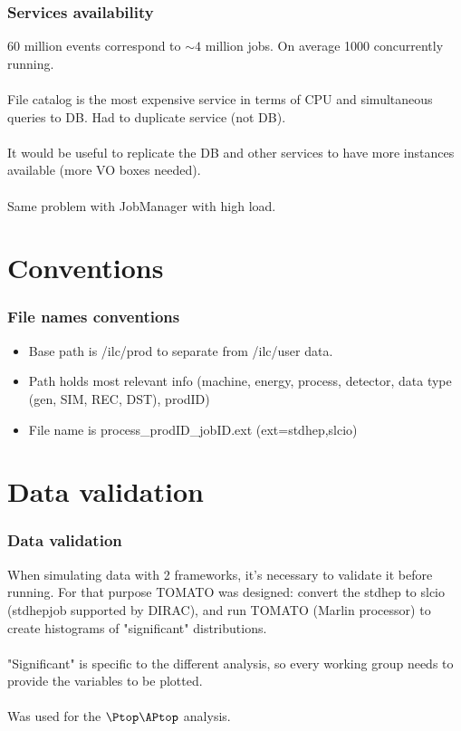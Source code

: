 \documentclass{beamer}
\begin{document}
\begin{frame}
\frametitle{Services availability}
60 million events correspond to $\sim 4$ million jobs. On average 1000 concurrently running.\\
~\\
File catalog is the most expensive service in terms of CPU and simultaneous queries to DB. Had to duplicate service (not DB). ~\\
~\\
It would be useful to replicate the DB and other services to have more instances available (more VO boxes needed).~\\
~\\
Same problem with JobManager with high load.
\end{frame}

\section{Conventions}
\begin{frame}
\frametitle{File names conventions}
\begin{itemize}
\item Base path is /ilc/prod to separate from /ilc/user data. 
\item Path holds most relevant info (machine, energy, process, detector, data type (gen, SIM, REC, DST), prodID)
\item File name is process\_prodID\_jobID.ext (ext=stdhep,slcio)
\end{itemize} 
 \end{frame}
\section{Data validation}
\begin{frame}
\frametitle{Data validation}
When simulating data with 2 frameworks, it's necessary to validate it before running. For that purpose \alert{TOMATO} was designed: convert the stdhep to slcio (stdhepjob supported by DIRAC), and run TOMATO (Marlin processor) to create histograms of "significant" distributions.  \\
~\\
"Significant" is specific to the different analysis, so every working group needs to provide the variables to be plotted.\\
~\\
Was used for the $\Ptop\APtop$ analysis.
\end{frame}
\end{document}
